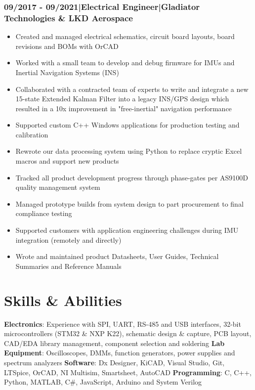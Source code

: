 \documentclass[]{article}
\begin{document}
\begin{singlespace}
\subsubsection*{09/2017 - 09/2021\hspace{3 mm}|\hspace{3 mm}Electrical Engineer\hspace{3 mm}|\hspace{3 mm}Gladiator Technologies \& LKD Aerospace}
\vspace{-2mm}
\begin{itemize}
    \setlength\itemsep{0em}
    \item Created and managed electrical schematics, circuit board layouts, board revisions and BOMs with OrCAD
    \item Worked with a small team to develop and debug firmware for IMUs and Inertial Navigation Systems (INS)
    \item Collaborated with a contracted team of experts to write and integrate a new 15-state Extended Kalman Filter into a legacy INS/GPS design which resulted in a 10x improvement in "free-inertial" navigation performance
    \item Supported custom C++ Windows applications for production testing and calibration
    \item Rewrote our data processing system using Python to replace cryptic Excel macros and support new products
    \item Tracked all product development progress through phase-gates per AS9100D quality management system
    \item Managed prototype builds from system design to part procurement to final compliance testing  
    \item Supported customers with application engineering challenges during IMU integration (remotely and directly)
    \item Wrote and maintained product Datasheets, User Guides, Technical Summaries and Reference Manuals
\end{itemize}

\section*{Skills \& Abilities}

\textbf{Electronics}: Experience with SPI, UART, RS-485 and USB interfaces, 32-bit microcontrollers (STM32 \& NXP K22), schematic design \& capture, PCB layout,
CAD/EDA library management, component selection and soldering
\newline\textbf{Lab Equipment}: Oscilloscopes, DMMs, function generators, power supplies and spectrum analyzers
\newline\textbf{Software}: Dx Designer, KiCAD, Visual Studio, Git, LTSpice, OrCAD, NI Multisim, Smartsheet, AutoCAD
\newline\textbf{Programming}: C, C++, Python, MATLAB, C\#, JavaScript, Arduino and System Verilog



\end{singlespace}
\end{document}
